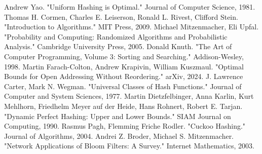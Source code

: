 \documentclass[letterpaper]{article}
\begin{document}
\begin{thebibliography}{9}
     Andrew Yao. "Uniform Hashing is Optimal." Journal of Computer Science, 1981.
     Thomas H. Cormen, Charles E. Leiserson, Ronald L. Rivest, Clifford Stein. "Introduction to Algorithms." MIT Press, 2009.
     Michael Mitzenmacher, Eli Upfal. "Probability and Computing: Randomized Algorithms and Probabilistic Analysis." Cambridge University Press, 2005.
     Donald Knuth. "The Art of Computer Programming, Volume 3: Sorting and Searching." Addison-Wesley, 1998.
     Martin Farach-Colton, Andrew Krapivin, William Kuszmaul. "Optimal Bounds for Open Addressing Without Reordering." arXiv, 2024.
     J. Lawrence Carter, Mark N. Wegman. "Universal Classes of Hash Functions." Journal of Computer and System Sciences, 1977.
     Martin Dietzfelbinger, Anna Karlin, Kurt Mehlhorn, Friedhelm Meyer auf der Heide, Hans Rohnert, Robert E. Tarjan. "Dynamic Perfect Hashing: Upper and Lower Bounds." SIAM Journal on Computing, 1990.
     Rasmus Pagh, Flemming Friche Rodler. "Cuckoo Hashing." Journal of Algorithms, 2004.
     Andrei Z. Broder, Michael S. Mitzenmacher. "Network Applications of Bloom Filters: A Survey." Internet Mathematics, 2003.
\end{thebibliography}
\end{document}
